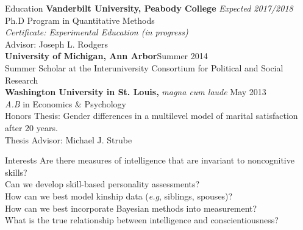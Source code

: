 \documentclass {resume}
\begin{document}
\nonfrenchspacing
\thispagestyle{myheadings}


\begin{rSection}{\textrm{Education}}
{\bf Vanderbilt University, Peabody College } \hfill  {\em Expected 2017/2018} \\ 
Ph.D Program in Quantitative Methods %
\\
\hspace* {3 mm}\textit{Certificate: Experimental Education (in progress)}\\
\hspace* {3 mm}Advisor: Joseph L. Rodgers\medskip\\
\textbf{University of Michigan, Ann Arbor}\hfill Summer 2014\\ 
Summer Scholar at the Interuniversity Consortium for Political and Social Research\medskip\\
{\bf Washington University in St. Louis, }\textit{magna cum laude} \hfill  {May 2013} \\ 
{\em A.B} in Economics \& Psychology\\
\hspace* {3 mm}Honors Thesis: Gender differences in a multilevel model of marital satisfaction after 20 years.  \\
\hspace* {3 mm}Thesis Advisor: Michael J. Strube%
\end{rSection}
\begin{rSection}{\textrm{Interests}} 
Are there measures of intelligence that are invariant to noncognitive skills?\\
Can we develop skill-based personality assessments?\\
How can we best model kinship data (\textit{e.g}, siblings, spouses)?\\
How can we best incorporate Bayesian methods into measurement?\\
What is the true relationship between intelligence and conscientiousness?\end{rSection}
\end{document}
